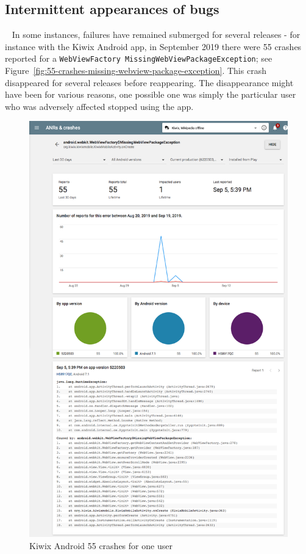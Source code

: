 \subsection{Intermittent appearances of bugs}~\label{section-intermittent-appearances-of-bugs-55-crashes}
In some instances, failures have remained submerged for several releases - for instance with the Kiwix Android app, in September 2019 there were 55 crashes reported for a \texttt{WebViewFactory MissingWebViewPackageException}; see Figure~\ref{fig:55-crashes-missing-webview-package-exception}. This crash disappeared for several releases before reappearing. The disappearance might have been for various reasons, one possible one was simply the particular user who was adversely affected stopped using the app. 

\begin{figure}
    \centering
    \includegraphics[width=13.5cm]{images/android-vitals-screenshots/55-crashes-WebViewFactory-MissingWebViewPackageException_2019-09-19-kiwix_trimmed.png}
    \caption{Kiwix Android 55 crashes for one user}
    \label{fig:55-crashes-WebViewFactory-MissingWebViewPackageException}
\end{figure}

